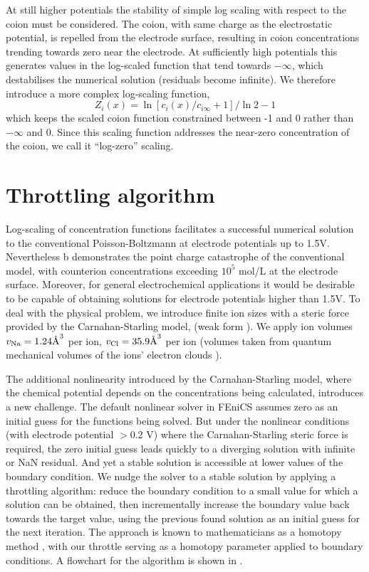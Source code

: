 At still higher potentials the stability of simple log scaling with
respect to the coion must be considered. The coion, with same charge
as the electrostatic potential, is repelled from the electrode surface,
resulting in coion concentrations trending towards zero near the electrode. At
sufficiently high potentials this generates values in the log-scaled
function that tend towards $-\infty$, which destabilises the numerical
solution (residuals become infinite). We therefore introduce a more complex log-scaling function,
\begin{equation}
Z_i(x) = \ln\left[c_i(x)/c_{i\infty}+1\right]/\ln 2 - 1
\label{log_zero}
\end{equation}
which keeps the scaled coion function constrained between -1 and 0
rather than $-\infty$ and 0. Since this scaling function addresses the
near-zero concentration of the coion, we call it ``log-zero'' scaling.

\section{Throttling algorithm}

Log-scaling of concentration functions facilitates a successful numerical solution to
the conventional Poisson-Boltzmann at electrode potentials
up to 1.5V. Nevertheless b demonstrates the
point charge catastrophe of the conventional model, with counterion
concentrations exceeding $10^{5}$ mol/L at the electrode
surface. Moreover, for general electrochemical applications it would
be desirable to be capable of obtaining solutions for electrode
potentials higher than 1.5V. To deal with the physical problem, we
introduce finite ion sizes with a steric force provided by the
Carnahan-Starling model,  (weak form
).  We apply ion volumes
$v_{\ce{Na}}=1.24 \text{\AA}^{3}$ per  ion,
$v_{\ce{Cl}}=35.9 \text{\AA}^{3}$ per  ion (volumes taken from
quantum mechanical volumes of the ions' electron clouds
\cite{ParsonsNinham2009}).

The additional nonlinearity introduced by the Carnahan-Starling model,
where the chemical potential depends on the concentrations being
calculated, introduces a new challenge. The default nonlinear solver
in FEniCS assumes zero as an initial guess for the functions being
solved. But under the nonlinear conditions (with electrode potential
$>0.2$ V) where the Carnahan-Starling steric force is required, the
zero initial guess leads quickly to a diverging solution with infinite
or NaN
residual. And yet a stable solution is accessible at lower values of
the boundary condition. We nudge the solver to a stable solution by
applying a throttling algorithm: reduce the boundary condition to a
small value for which a solution can be obtained, then incrementally
increase the boundary value back towards the target value, using the
previous found solution as an initial guess for the next
iteration. The approach is known to mathematicians as a homotopy
 method \cite{homotopy_analysis_Liao2012}, with our throttle
serving as a homotopy parameter applied to boundary conditions.
A flowchart for the algorithm is
shown in .

